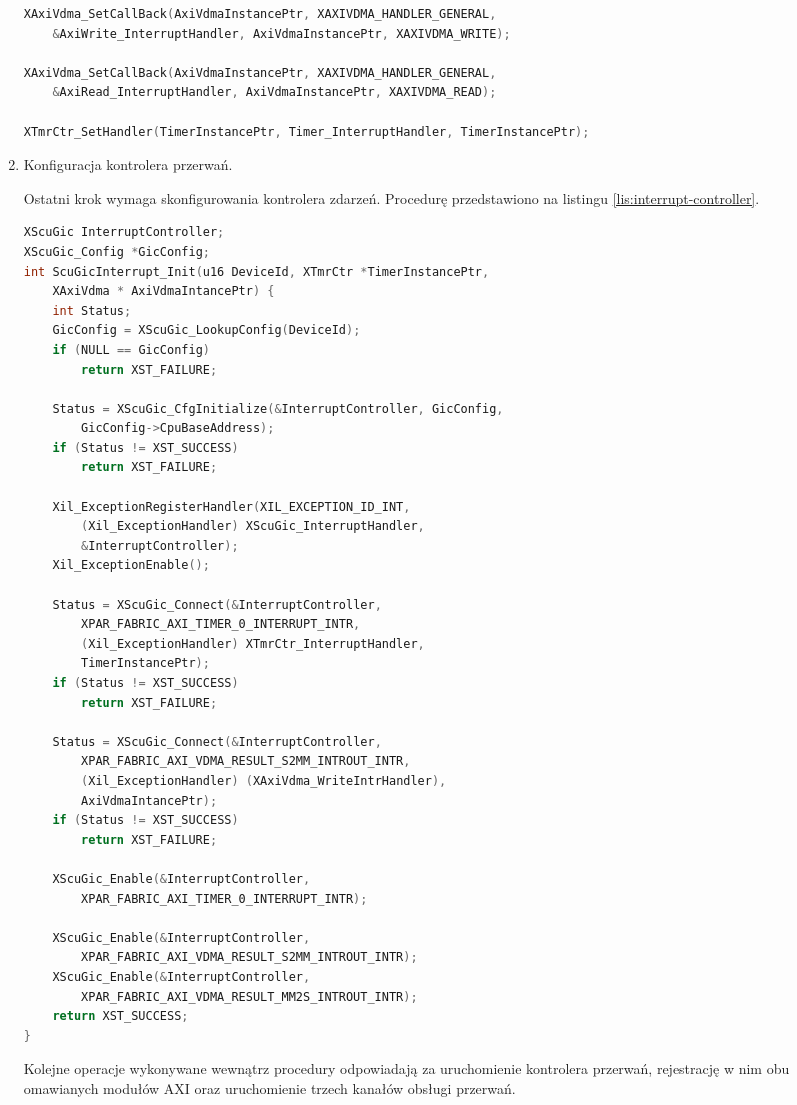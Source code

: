 \begin{enumerate}
\begin{lstlisting}[language=C, caption=Rejestracja agentów przerwań., label=lis:interrupt-handlers-2]
XAxiVdma_SetCallBack(AxiVdmaInstancePtr, XAXIVDMA_HANDLER_GENERAL,
	&AxiWrite_InterruptHandler, AxiVdmaInstancePtr, XAXIVDMA_WRITE);

XAxiVdma_SetCallBack(AxiVdmaInstancePtr, XAXIVDMA_HANDLER_GENERAL,
	&AxiRead_InterruptHandler, AxiVdmaInstancePtr, XAXIVDMA_READ);

XTmrCtr_SetHandler(TimerInstancePtr, Timer_InterruptHandler, TimerInstancePtr);
\end{lstlisting}

	\item Konfiguracja kontrolera przerwań.
	
Ostatni krok wymaga skonfigurowania kontrolera zdarzeń. Procedurę przedstawiono na listingu \ref{lis:interrupt-controller}.

\begin{lstlisting}[language=C, caption=Konfiguracja kontrolera przerwań., label=lis:interrupt-controller]
XScuGic InterruptController;
XScuGic_Config *GicConfig;
int ScuGicInterrupt_Init(u16 DeviceId, XTmrCtr *TimerInstancePtr,
	XAxiVdma * AxiVdmaIntancePtr) {
	int Status;
	GicConfig = XScuGic_LookupConfig(DeviceId);
	if (NULL == GicConfig)
		return XST_FAILURE;
	
	Status = XScuGic_CfgInitialize(&InterruptController, GicConfig,
		GicConfig->CpuBaseAddress);
	if (Status != XST_SUCCESS)
		return XST_FAILURE;
	
	Xil_ExceptionRegisterHandler(XIL_EXCEPTION_ID_INT,
		(Xil_ExceptionHandler) XScuGic_InterruptHandler,
		&InterruptController);
	Xil_ExceptionEnable();
	
	Status = XScuGic_Connect(&InterruptController,
		XPAR_FABRIC_AXI_TIMER_0_INTERRUPT_INTR,
		(Xil_ExceptionHandler) XTmrCtr_InterruptHandler,
		TimerInstancePtr);
	if (Status != XST_SUCCESS)
		return XST_FAILURE;
	
	Status = XScuGic_Connect(&InterruptController,
		XPAR_FABRIC_AXI_VDMA_RESULT_S2MM_INTROUT_INTR,
		(Xil_ExceptionHandler) (XAxiVdma_WriteIntrHandler),
		AxiVdmaIntancePtr);
	if (Status != XST_SUCCESS)
		return XST_FAILURE;
	
	XScuGic_Enable(&InterruptController,
		XPAR_FABRIC_AXI_TIMER_0_INTERRUPT_INTR);
	
	XScuGic_Enable(&InterruptController,
		XPAR_FABRIC_AXI_VDMA_RESULT_S2MM_INTROUT_INTR);
	XScuGic_Enable(&InterruptController,
		XPAR_FABRIC_AXI_VDMA_RESULT_MM2S_INTROUT_INTR);
	return XST_SUCCESS;
}
\end{lstlisting}

Kolejne operacje wykonywane wewnątrz procedury odpowiadają za uruchomienie kontrolera przerwań, rejestrację w nim obu omawianych modułów AXI oraz uruchomienie trzech kanałów obsługi przerwań.
\end{enumerate}

